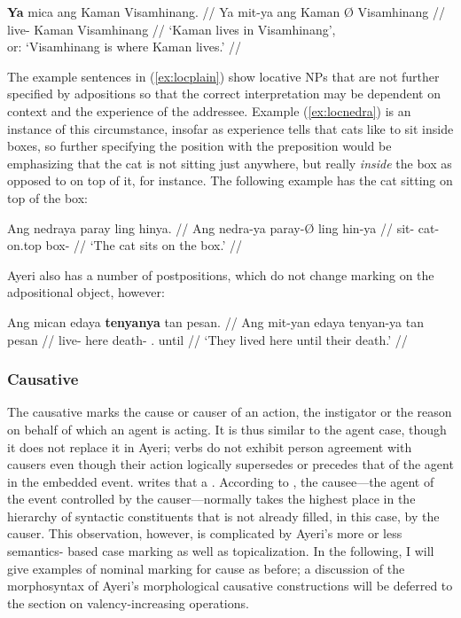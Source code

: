 \a\label{ex:locmit}\begingl
	\gla \textbf{Ya} mica ang Kaman {} Visamhinang. //
	\glb Ya mit-ya ang Kaman Ø Visamhinang //
	\glc \LocT{} live-\TsgM{} \Aarg{} Kaman \Top{} Visamhinang //
	\glft `Kaman lives in Visamhinang',\\
		or: `Visamhinang is where Kaman lives.' //
\endgl

\xe

The example sentences in (\ref{ex:locplain}) show locative NPs that are not
further specified by adpositions so that the correct interpretation may be
dependent on context and the experience of the addressee. Example
(\ref{ex:locnedra}) is an instance of this circumstance, insofar as experience
tells that cats like to sit inside boxes, so further specifying the position
with the preposition  would be emphasizing that the
cat is not sitting just anywhere, but really \emph{inside} the box as opposed
to on top of it, for instance. The following example has the cat sitting on top
of the box:

\ex\begingl
	\gla Ang nedraya paray ling hinya. //
	\glb Ang nedra-ya paray-Ø ling hin-ya //
	\glc \AgtT{} sit-\TsgM{} cat-\Top{} on.top box-\Loc{} //
	\glft `The cat sits on the box.' //
\endgl\xe

Ayeri also has a number of postpositions, which do not change marking on the 
adpositional object, however:

\ex\begingl
	\gla Ang mican edaya \textbf{tenyanya} tan pesan. //
	\glb Ang mit-yan edaya tenyan-ya tan pesan //
	\glc \AgtT{} live-\TplM{} here death-\Loc{} \TplM{}.\Gen{} until //
	\glft `They lived here until their death.' //
\endgl\xe


\subsubsection{Causative}

The causative marks the cause or causer of an action, the instigator or the
reason on behalf of which an agent is acting. It is thus similar to the agent
case, though it does not replace it in Ayeri; verbs do not exhibit person
agreement with causers even though their action logically supersedes or
precedes that of the agent in the embedded event. \citet{dixon2000} writes that
a .
According to \citet[176]{comrie1989}, the causee---the agent of the event
controlled by the causer---normally takes the highest place in the hierarchy of
syntactic constituents that is not already filled, in this case, by the causer.
This observation, however, is complicated by Ayeri's more or less semantics-
based case marking as well as topicalization. In the following, I will give
examples of nominal marking for cause as before; a discussion of the
morphosyntax of Ayeri's morphological causative constructions will be deferred
to the section on valency-increasing operations.

